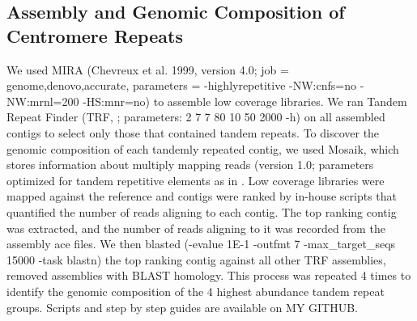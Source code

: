 \documentclass[10pt,letterpaper]{article}
\begin{document}
\subsection*{Assembly and Genomic Composition of Centromere Repeats}


We used MIRA (Chevreux et al. 1999, version 4.0; job = genome,denovo,accurate, parameters = -highlyrepetitive -NW:cnfs=no -NW:mrnl=200 -HS:mnr=no) to assemble low coverage libraries.
We ran Tandem Repeat Finder \cite{benson1999tandem}  (TRF, ; parameters: 2 7 7 80 10 50 2000 -h) on all assembled contigs to select only those that contained tandem repeats.  
To discover the genomic composition of each tandemly repeated contig, we used Mosaik, which stores information about multiply mapping reads (version 1.0; parameters optimized for tandem repetitive elements as in \cite{bilinski2014diversity}.
Low coverage libraries were mapped against the reference and contigs were ranked by in-house scripts that quantified the number of reads aligning to each contig.
The top ranking contig was extracted, and the number of reads aligning to it was recorded from the assembly ace files.
We then blasted (-evalue 1E-1 -outfmt 7 -max\_target\_seqs 15000 -task blastn) the top ranking contig against all other TRF assemblies, removed assemblies with BLAST homology.
This process was repeated 4 times to identify the genomic composition of the 4 highest abundance tandem repeat groups.
Scripts and step by step guides are available on MY GITHUB.
\end{document}
